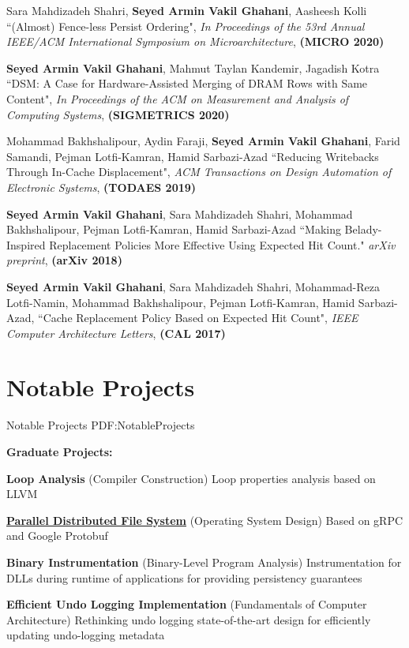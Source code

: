 \documentclass[a4paper,9pt,oneside]{article}
\begin{document}
\begin{body}
\BulletItem
Sara Mahdizadeh Shahri,
\textbf{Seyed Armin Vakil Ghahani},
Aasheesh Kolli
``(Almost) Fence-less Persist Ordering", \textit{In Proceedings of the 53rd Annual IEEE/ACM International Symposium on Microarchitecture}, \textbf{(MICRO 2020)}

\BulletItem
\textbf{Seyed Armin Vakil Ghahani},
Mahmut Taylan Kandemir,
Jagadish Kotra
``DSM: A Case for Hardware-Assisted Merging of DRAM Rows with Same Content", \textit{In Proceedings of the ACM on Measurement and Analysis of Computing Systems}, \textbf{(SIGMETRICS 2020)}

\BulletItem
Mohammad Bakhshalipour,
Aydin Faraji,
\textbf{Seyed Armin Vakil Ghahani},
Farid Samandi,
Pejman Lotfi-Kamran,
Hamid Sarbazi-Azad
``Reducing Writebacks Through In-Cache Displacement", \textit{ACM Transactions on Design Automation of Electronic Systems}, \textbf{(TODAES 2019)}

\BulletItem
\textbf{Seyed Armin Vakil Ghahani},
Sara Mahdizadeh Shahri,
Mohammad Bakhshalipour,
Pejman Lotfi-Kamran,
Hamid Sarbazi-Azad
``Making Belady-Inspired Replacement Policies More Effective Using Expected Hit Count." \textit{arXiv preprint}, \textbf{(arXiv 2018)}


\BulletItem
\textbf{Seyed Armin Vakil Ghahani},
Sara Mahdizadeh Shahri,
Mohammad-Reza Lotfi-Namin,
Mohammad Bakhshalipour,
Pejman Lotfi-Kamran,
Hamid Sarbazi-Azad,
``Cache Replacement Policy Based on Expected Hit Count", \textit{IEEE Computer Architecture Letters}, \textbf{(CAL 2017)}

\section
{Notable Projects}
{Notable Projects}
{PDF:NotableProjects}

\textbf{Graduate Projects:}

\BulletItem
\textbf{Loop Analysis}
(Compiler Construction)
\hfill
{}
\SubBulletItem
Loop properties analysis based on LLVM

\BulletItem
\href{https://github.com/arminvakil/PFS}
{\textbf{Parallel Distributed File System}}
(Operating System Design)
\hfill
{}
\SubBulletItem
Based on gRPC and Google Protobuf

\BulletItem
\textbf{Binary Instrumentation}
(Binary-Level Program Analysis)
\hfill
{}
\SubBulletItem
Instrumentation for DLLs during runtime of applications for providing persistency guarantees

\BulletItem
{\textbf{Efficient Undo Logging Implementation}}
(Fundamentals of Computer Architecture)
\hfill
{}
\SubBulletItem
Rethinking undo logging state-of-the-art design for efficiently updating undo-logging metadata


\end{body}
\end{document}
